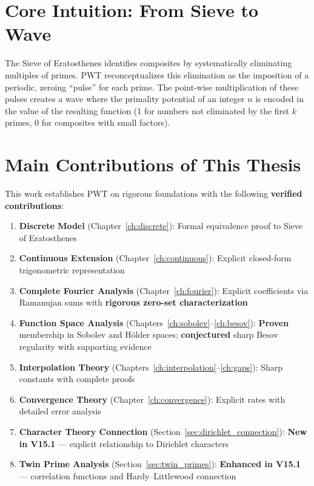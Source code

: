 ﻿\documentclass[12pt,a4paper]{report}
\theoremstyle{plain}
\theoremstyle{definition}
\begin{document}
\section{Core Intuition: From Sieve to Wave}

The Sieve of Eratosthenes identifies composites by systematically eliminating multiples of primes. PWT reconceptualizes this elimination as the imposition of a periodic, zeroing ``pulse'' for each prime. The point-wise multiplication of these pulses creates a wave where the primality potential of an integer $n$ is encoded in the value of the resulting function (1 for numbers not eliminated by the first $k$ primes, 0 for composites with small factors).

\section{Main Contributions of This Thesis}

This work establishes PWT on rigorous foundations with the following \textbf{verified contributions}:

\begin{enumerate}
    \item \textbf{Discrete Model} (Chapter~\ref{ch:discrete}): Formal equivalence proof to Sieve of Eratosthenes
    \item \textbf{Continuous Extension} (Chapter~\ref{ch:continuous}): Explicit closed-form trigonometric representation
    \item \textbf{Complete Fourier Analysis} (Chapter~\ref{ch:fourier}): Explicit coefficients via Ramanujan sums with \textbf{rigorous zero-set characterization}
    \item \textbf{Function Space Analysis} (Chapters~\ref{ch:sobolev}--\ref{ch:besov}): \textbf{Proven} membership in Sobolev and H\"older spaces; \textbf{conjectured} sharp Besov regularity with supporting evidence
    \item \textbf{Interpolation Theory} (Chapters~\ref{ch:interpolation}--\ref{ch:gaps}): Sharp constants with complete proofs
    \item \textbf{Convergence Theory} (Chapter~\ref{ch:convergence}): Explicit rates with detailed error analysis
    \item \textbf{Character Theory Connection} (Section~\ref{sec:dirichlet_connection}): \textbf{New in V15.1} --- explicit relationship to Dirichlet characters
    \item \textbf{Twin Prime Analysis} (Section~\ref{sec:twin_primes}): \textbf{Enhanced in V15.1} --- correlation functions and Hardy--Littlewood connection
\end{enumerate}
\end{document}
